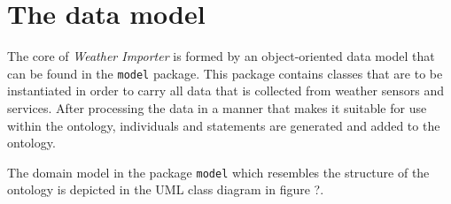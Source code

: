 \section{The data model}
\label{sec:importer_model}

The core of \emph{Weather Importer} is formed by an object-oriented data model that can be found in the \texttt{model} package. This package contains classes that are to be instantiated in order to carry all data that is collected from weather sensors and services. After processing the data in a manner that makes it suitable for use within the \thinkhomeweather ontology, individuals and statements are generated and added to the ontology.

The domain model in the package \texttt{model} which resembles the structure of the \thinkhomeweather ontology is depicted in the UML class diagram in figure ?.

